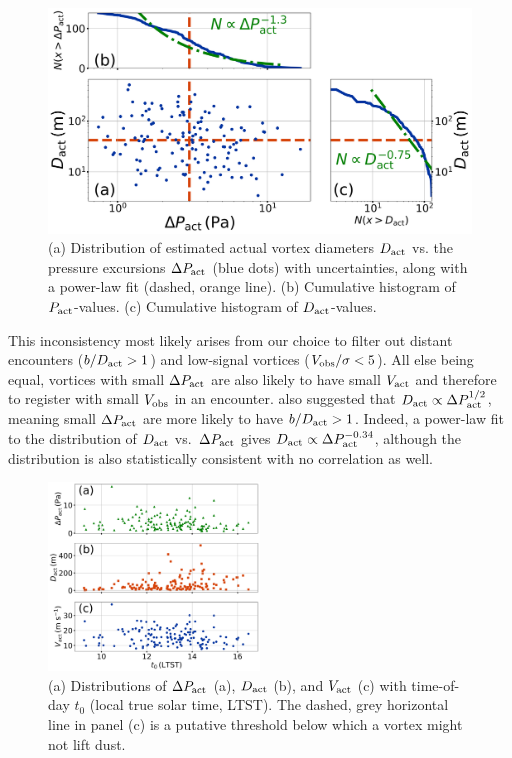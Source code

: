 \documentclass{aastex63}
\begin{document}
\begin{figure}
    \centering
    \includegraphics[width=\textwidth]{figures/Dact_vs_Pact.png}
    \caption{(a) Distribution of estimated actual vortex diameters $D_{\rm act}$ vs. the pressure excursions $\Delta P_{\rm act}$ (blue dots) with uncertainties, along with a power-law fit (dashed, orange line). (b) Cumulative histogram of $P_{\rm act}$-values. (c) Cumulative histogram of $D_{\rm act}$-values.}
    \label{fig:Dact_vs_Pact}
\end{figure}

This inconsistency most likely arises from our choice to filter out distant encounters ($b/D_{\rm act} > 1$) and low-signal vortices ($V_{\rm obs}/\sigma < 5$). All else being equal, vortices with small $\Delta P_{\rm act}$ are also likely to have small $V_{\rm act}$ and therefore to register with small $V_{\rm obs}$ in an encounter. \citet{2020Icar..33813523J} also suggested that $D_{\rm act} \propto \Delta P_{\rm act}^{1/2}$, meaning small $\Delta P_{\rm act}$ are more likely to have $b/D_{\rm act} > 1$. Indeed, a power-law fit to the distribution of $D_{\rm act}$ vs.~$\Delta P_{\rm act}$ gives $D_{\rm act} \propto \Delta P_{\rm act}^{-0.34}$, although the distribution is also statistically consistent with no correlation as well. 

\begin{figure}
    \centering
    \includegraphics[width=0.5\textwidth]{figures/all_actual_values_vs_t0.png}
    \caption{(a) Distributions of $\Delta P_{\rm act}$ (a), $D_{\rm act}$ (b), and $V_{\rm act}$ (c) with time-of-day $t_0$ (local true solar time, LTST). The dashed, grey horizontal line in panel (c) is a putative threshold below which a vortex might not lift dust.}
    \label{fig:all_actual_values_vs_t0}
\end{figure}
\end{document}
